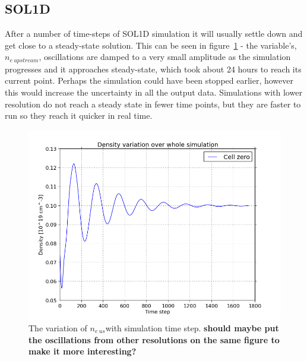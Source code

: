 \documentclass[11pt, twocolumn]{article}  %
\providecommand{\neupstream}{$n_{e~upstream}$} %
\providecommand{\neus}{$n_{e~us}$} %
\begin{document}
\subsection{SOL1D}\label{ssec:SOL1D}
After a number of time-steps of SOL1D simulation it will usually settle down and get close to a steady-state solution. This can be seen in figure~\ref{fig:ne_var_ny=800} - the variable's, \neupstream, oscillations are damped to a very small amplitude as the simulation progresses and it approaches steady-state, which took about 24 hours to reach its current point. Perhaps the simulation could have been stopped earlier, however this would increase the uncertainty in all the output data. Simulations with lower resolution do not reach a steady state in fewer time points, but they are faster to run so they reach it quicker in real time.

\begin{figure}
\includegraphics[scale=0.4]{Figures/sol1d/ne_var_ny=800.png}
\centering
\caption{The variation of \neus with simulation time step. \textbf{should maybe put the oscillations from other resolutions on the same figure to make it more interesting?}}\label{fig:ne_var_ny=800}
\end{figure}
\end{document}
